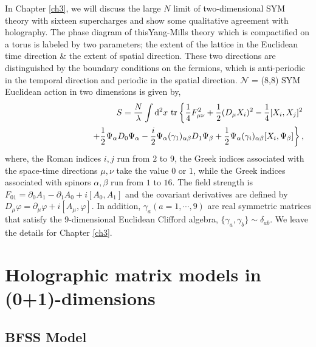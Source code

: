In Chapter \ref{ch3}, we will discuss the large $N$ limit of two-dimensional SYM theory with sixteen supercharges
and show some qualitative agreement with holography. 
The phase diagram of thisYang-Mills theory which is compactified on a torus is labeled by two parameters; 
the extent of the lattice in the Euclidean time direction \& the extent of spatial direction. These two 
directions are distinguished by the boundary conditions on the fermions, which is anti-periodic in the
temporal direction and periodic in the spatial direction.  
$\mathcal{N}$ = (8,8) SYM Euclidean action in two dimensions is given by, 
\begin{eqnarray}
&& 
       S=\frac{N}{\lambda}\int{}{\rm d}^2x\ {\rm tr} 
             \left\{ \frac{1}{4}F^2_{\mu\nu} 
                    + \frac{1}{2}(D_\mu X_i)^2 - \frac{1}{4}[X_i,X_j]^2  
             \right.  \nonumber \\
&& 
      \hspace{3cm} \left.
          +\frac{1}{2} \Psi_\alpha  D_0 \Psi_\alpha 
          -\frac{i}{2} \Psi_\alpha (\gamma_{1})_{\alpha \beta} D_1 \Psi_\beta 
        + \frac{1}{2}\Psi_\alpha (\gamma_i)_{\alpha \beta} [X_i, \Psi_\beta] \right\},
        \label{cont_action}
\end{eqnarray}
where, the Roman indices $i,j$ run from $2$ to $9$, 
the Greek indices associated with the space-time directions $\mu,\nu$ take the value $0$ or $1$,
while the Greek indices associated with spinors $\alpha, \beta$ run from $1$ to $16$. 
The field strength is $F_{01} = \partial_0 A_1 - \partial_1 A_0 +i[A_0,A_1]$ and the covariant derivatives are 
defined by $D_\mu \varphi = \partial_\mu \varphi + i[A_\mu, \varphi]$.  
In addition, $\gamma_a(a=1,\cdots,9)$ are real symmetric matrices that satisfy the 9-dimensional Euclidean Clifford algebra,
$\{\gamma_a,\gamma_b\} \sim \delta_{ab}$. We leave the details for Chapter \ref{ch3}. 

\section{Holographic matrix models in (0+1)-dimensions} 
  
\subsection{BFSS Model}

